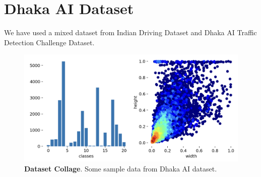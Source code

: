 \section{Dhaka AI Dataset}
We have used  a mixed dataset from Indian Driving Dataset and Dhaka AI Traffic Detection Challenge Dataset. 
\begin{figure}[H] %
  \centering
  \includegraphics[width=\textwidth]{figures/paper/dhaka-ai+idd.png}
  \caption[Dataset Collage]{\textbf{Dataset Collage}. Some sample data from Dhaka AI dataset.}
  \label{fig:figures/paper/dhaka-ai+idd.png}
\end{figure}


